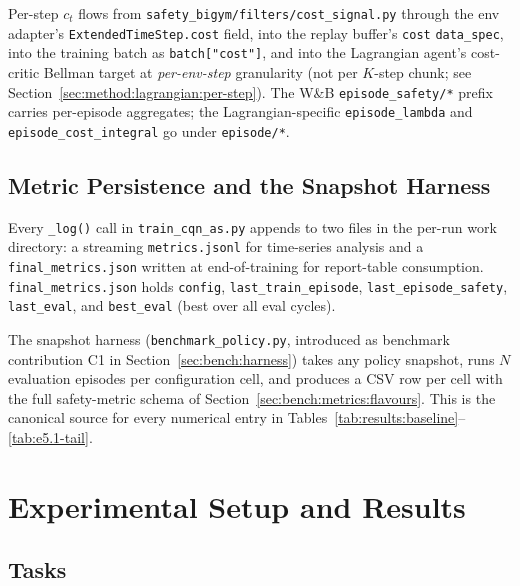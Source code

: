 \documentclass[11pt,a4paper]{report}
\begin{document}
Per-step $c_t$ flows from
\texttt{safety\_bigym/filters/cost\_signal.py} through the env
adapter's \texttt{ExtendedTimeStep.cost} field, into the replay
buffer's \texttt{cost} \texttt{data\_spec}, into the training batch
as \texttt{batch["cost"]}, and into the Lagrangian agent's
cost-critic Bellman target at \emph{per-env-step} granularity (not
per $K$-step chunk; see Section~\ref{sec:method:lagrangian:per-step}).
The W\&B \texttt{episode\_safety/*} prefix carries per-episode
aggregates; the Lagrangian-specific \texttt{episode\_lambda} and
\texttt{episode\_cost\_integral} go under \texttt{episode/*}.

\section{Metric Persistence and the Snapshot Harness}
\label{sec:impl:metrics}

Every \texttt{\_log()} call in \texttt{train\_cqn\_as.py} appends
to two files in the per-run work directory: a streaming
\texttt{metrics.jsonl} for time-series analysis and a
\texttt{final\_metrics.json} written at end-of-training for
report-table consumption. \texttt{final\_metrics.json} holds
\texttt{config}, \texttt{last\_train\_episode},
\texttt{last\_episode\_safety}, \texttt{last\_eval}, and
\texttt{best\_eval} (best over all eval cycles).

The snapshot harness (\texttt{benchmark\_policy.py}, introduced as
benchmark contribution C1 in Section~\ref{sec:bench:harness})
takes any policy snapshot, runs $N$ evaluation episodes per
configuration cell, and produces a CSV row per cell with the full
safety-metric schema of Section~\ref{sec:bench:metrics:flavours}.
This is the canonical source for every numerical entry in
Tables~\ref{tab:results:baseline}--\ref{tab:e5.1-tail}.

\chapter{Experimental Setup and Results}
\label{ch:eval}

\section{Tasks}
\label{sec:setup:tasks}
\end{document}
